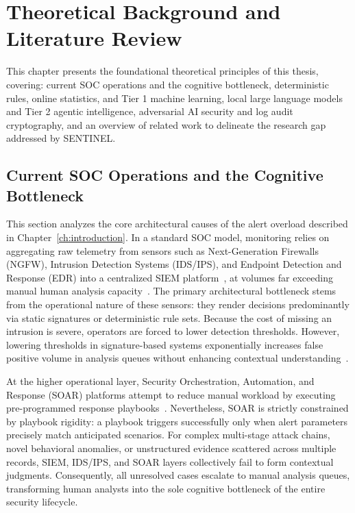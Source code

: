 \chapter{Theoretical Background and Literature Review}
\label{ch:theoretical_background}

This chapter presents the foundational theoretical principles of this thesis, covering: current SOC operations and the cognitive bottleneck, deterministic rules, online statistics, and Tier 1 machine learning, local large language models and Tier 2 agentic intelligence, adversarial AI security and log audit cryptography, and an overview of related work to delineate the research gap addressed by SENTINEL.

\section{Current SOC Operations and the Cognitive Bottleneck}

This section analyzes the core architectural causes of the alert overload described in Chapter~\ref{ch:introduction}. In a standard SOC model, monitoring relies on aggregating raw telemetry from sensors such as Next-Generation Firewalls (NGFW), Intrusion Detection Systems (IDS/IPS), and Endpoint Detection and Response (EDR) into a centralized SIEM platform~\cite{siem2021}, at volumes far exceeding manual human analysis capacity~\cite{bigdata2019}. The primary architectural bottleneck stems from the operational nature of these sensors: they render decisions predominantly via static signatures or deterministic rule sets. Because the cost of missing an intrusion is severe, operators are forced to lower detection thresholds. However, lowering thresholds in signature-based systems exponentially increases false positive volume in analysis queues without enhancing contextual understanding~\cite{alertfatigue2022, alahmadi2022}.

At the higher operational layer, Security Orchestration, Automation, and Response (SOAR) platforms attempt to reduce manual workload by executing pre-programmed response playbooks~\cite{soar2025}. Nevertheless, SOAR is strictly constrained by playbook rigidity: a playbook triggers successfully only when alert parameters precisely match anticipated scenarios. For complex multi-stage attack chains, novel behavioral anomalies, or unstructured evidence scattered across multiple records, SIEM, IDS/IPS, and SOAR layers collectively fail to form contextual judgments. Consequently, all unresolved cases escalate to manual analysis queues, transforming human analysts into the sole cognitive bottleneck of the entire security lifecycle.

